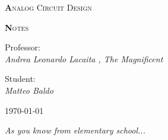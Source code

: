 \begin{titlepage}

	\centering
	{\scshape\huge\textbf Analog Circuit Design \par}
	{\scshape\huge\textbf Notes \par}	
	\vspace{13cm}
{Professor:\\ \textit{Andrea Leonardo Lacaita , The Magnificent}}	

\vspace{0.5cm}

{Student:\\ \textit{Matteo Baldo}}


\vspace{2cm}
	\vfill
	\raggedleft
	{\today\par}

\vspace{1cm}
\raggedright
{ \it As you know from elementary school...}
	
\end{titlepage}
        \newpage
		\setcounter{page}{1}
        \null 
        \thispagestyle{empty} 
        \newpage  

\tableofcontents

